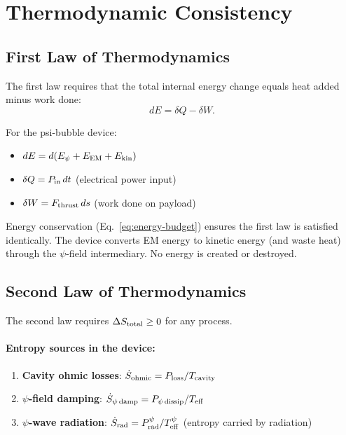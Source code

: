 \documentclass[aps,prd,twocolumn,superscriptaddress,floatfix,nofootinbib]{revtex4-2}
\begin{document}
\section{Thermodynamic Consistency}\label{sec:thermodynamics}

\subsection{First Law of Thermodynamics}

The first law requires that the total internal energy change equals
heat added minus work done:
\begin{equation}
dE = \delta Q - \delta W.
\label{eq:first-law}
\end{equation}

For the psi-bubble device:
\begin{itemize}[nosep]
\item $dE = d(E_\psi + E_{\rm EM} + E_{\rm kin})$
\item $\delta Q = P_{\rm in}\,dt$ (electrical power input)
\item $\delta W = F_{\rm thrust}\,ds$ (work done on payload)
\end{itemize}

Energy conservation (Eq.~\eqref{eq:energy-budget}) ensures the first
law is satisfied identically. The device converts EM energy to kinetic
energy (and waste heat) through the $\psi$-field intermediary. No energy
is created or destroyed.

\subsection{Second Law of Thermodynamics}

The second law requires $\Delta S_{\rm total} \geq 0$ for any process.

\paragraph{Entropy sources in the device:}
\begin{enumerate}[nosep]
\item \textbf{Cavity ohmic losses}: $\dot{S}_{\rm ohmic}
= P_{\rm loss}/T_{\rm cavity}$
\item \textbf{$\psi$-field damping}: $\dot{S}_{\psi\,{\rm damp}}
= P_{\psi\,{\rm dissip}}/T_{\rm eff}$
\item \textbf{$\psi$-wave radiation}: $\dot{S}_{\rm rad}
= P_{\rm rad}^\psi/T_{\rm eff}^\psi$
(entropy carried by radiation)
\end{enumerate}
\end{document}
